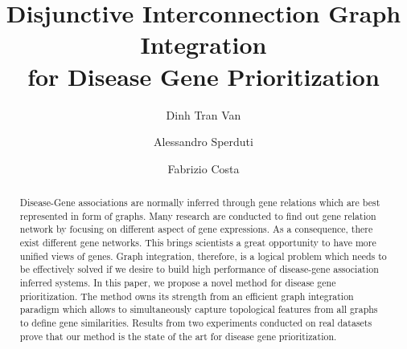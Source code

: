 \documentclass[sigconf]{acmart}
\begin{document}
\title{Disjunctive Interconnection Graph Integration \\for Disease Gene Prioritization}


\author{Dinh Tran Van}

\author{Alessandro Sperduti}

\author{Fabrizio Costa}



\begin{abstract}
Disease-Gene associations are normally inferred through gene relations which are best represented in form of graphs. Many research are conducted to find out gene relation network by focusing on different aspect of gene expressions. As a consequence, there exist different gene networks. This brings scientists a great opportunity  to have more unified views of genes. Graph integration, therefore, is a logical problem which needs to be effectively solved if we desire to build high performance of disease-gene association inferred systems. In this paper, we propose a novel method for disease gene prioritization. The method owns its strength from an efficient graph integration paradigm which allows to simultaneously capture topological features from all graphs to define gene similarities. Results from two experiments conducted on real datasets prove that our method is the state of the art for disease gene prioritization.
\end{abstract}
\end{document}
